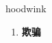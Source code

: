 
\begin{frame}
{\huge hoodwink}
\begin{center}
\begin{enumerate}\Large
  \item \textbf{欺骗}
\end{enumerate}
\end{center}
\end{frame}
